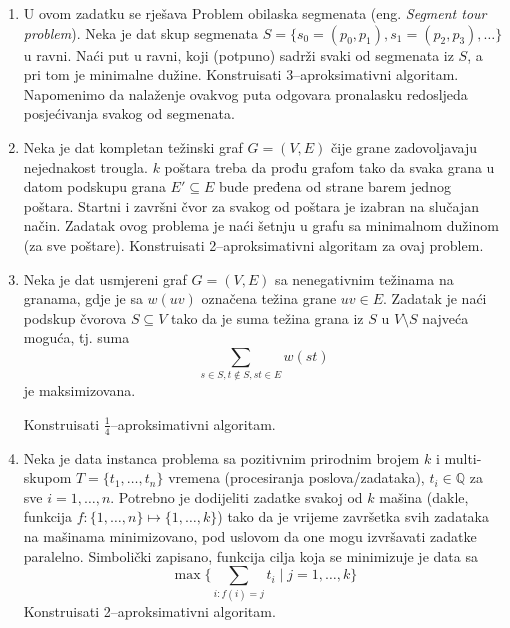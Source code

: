 \documentclass[b5paper, utf8, 11pt, colorlinks]{book}
\theoremstyle{definition}
\begin{document}
\begin{enumerate}
		 \item %
		 U ovom zadatku se rješava Problem obilaska segmenata (eng. \emph{Segment tour problem}). Neka je dat skup segmenata $S = \{s_0 = (p_0, p_1), s_1 =(p_2, p_3),\ldots\}$ u ravni. Naći put u ravni, koji (potpuno) sadrži svaki od segmenata iz $S$, a pri tom je minimalne dužine. Konstruisati 3--aproksimativni algoritam. Napomenimo da nalaženje ovakvog puta odgovara pronalasku redosljeda posjećivanja svakog od segmenata. 
		 \item Neka je dat kompletan težinski graf $G=(V,E)$ čije grane zadovoljavaju nejednakost trougla. $ k$ poštara treba da prođu grafom tako da svaka grana u datom podskupu grana $E' \subseteq E$ bude pređena  od strane barem jednog poštara. Startni i završni čvor za svakog od poštara je izabran na slučajan način. Zadatak ovog problema je naći šetnju u grafu sa minimalnom dužinom (za sve poštare). 
		 Konstruisati 2--aproksimativni algoritam za ovaj problem. 
		 \item %
		 Neka je dat usmjereni graf $G = (V,E) $ sa nenegativnim težinama na granama, gdje je sa $w(uv)$ označena težina grane $uv\in E$. Zadatak je naći podskup čvorova $S \subseteq V$ tako da je suma težina grana iz $S$ u $V\setminus S$ najveća moguća, tj. suma
		  $$ \sum_{s \in S, t \notin S, st \in E }w(st)$$
		  je maksimizovana.  
		  
		  Konstruisati $\frac{1}{4}$--aproksimativni algoritam.
		  
		  
		 \item  %
		 Neka je data instanca problema sa pozitivnim prirodnim  brojem $k$ i multi-skupom 
		 $T = \{t_1,\ldots, t_n\}$ vremena (procesiranja poslova/zada\-taka), $t_i \in \mathbb{Q}$ za sve $i=1,\ldots, n$. 
		 Potrebno je dodijeliti zadatke svakoj od $k$ mašina (dakle, funkcija $f:\{1,\ldots, n\} \mapsto \{1,\ldots, k\}$) tako da je vrijeme završetka svih zadataka na mašinama minimizovano, pod uslovom da one mogu izvršavati zadatke paralelno. Simbolički zapisano, funkcija cilja koja se minimizuje je data sa 
		 $$\max \{\sum_{i: f(i) = j } t_i \mid j=1,\ldots, k \}$$
		 Konstruisati 2--aproksimativni algoritam.
\end{enumerate}
\end{document}
